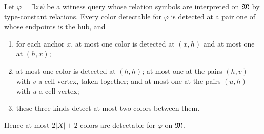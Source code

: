 \begin{lemma}\label{lem:where}
Let $\varphi=\exists z\,\psi$ be a witness query whose relation symbols are
interpreted on $\mathfrak M$ by type-constant relations. Every color detectable for
$\varphi$ is detected at a pair one of whose endpoints is the hub, and
\begin{enumerate}[nosep,label=(\alph*)]
\item for each anchor $x$, at most one color is detected at $(x,h)$ and at
 most one at $(h,x)$;
\item at most one color is detected at $(h,h)$; at most one at the pairs
 $(h,v)$ with $v$ a cell vertex, taken together; and at most one at the
 pairs $(u,h)$ with $u$ a cell vertex;
\item these three kinds detect at most two colors between them.
\end{enumerate}
Hence at most $2|X|+2$ colors are detectable for $\varphi$ on $\mathfrak M$.
\end{lemma}
